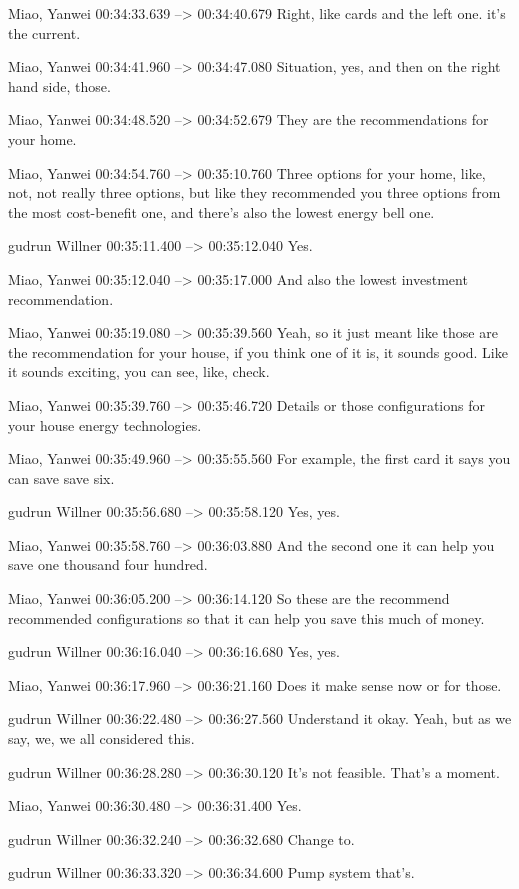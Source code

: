 {Miao, Yanwei 00:34:33.639 --> 00:34:40.679
Right, like cards and the left one. it's the current.

Miao, Yanwei 00:34:41.960 --> 00:34:47.080
Situation, yes, and then on the right hand side, those.

Miao, Yanwei 00:34:48.520 --> 00:34:52.679
They are the recommendations for your home.

Miao, Yanwei 00:34:54.760 --> 00:35:10.760
Three options for your home, like, not, not really three options, but like they recommended you three options from the most cost-benefit one, and there's also the lowest energy bell one.

gudrun Willner 00:35:11.400 --> 00:35:12.040
Yes.

Miao, Yanwei 00:35:12.040 --> 00:35:17.000
And also the lowest investment recommendation.

Miao, Yanwei 00:35:19.080 --> 00:35:39.560
Yeah, so it just meant like those are the recommendation for your house, if you think one of it is, it sounds good. Like it sounds exciting, you can see, like, check.

Miao, Yanwei 00:35:39.760 --> 00:35:46.720
Details or those configurations for your house energy technologies.

Miao, Yanwei 00:35:49.960 --> 00:35:55.560
For example, the first card it says you can save save six.

gudrun Willner 00:35:56.680 --> 00:35:58.120
Yes, yes.

Miao, Yanwei 00:35:58.760 --> 00:36:03.880
And the second one it can help you save one thousand four hundred.

Miao, Yanwei 00:36:05.200 --> 00:36:14.120
So these are the recommend recommended configurations so that it can help you save this much of money.

gudrun Willner 00:36:16.040 --> 00:36:16.680
Yes, yes.

Miao, Yanwei 00:36:17.960 --> 00:36:21.160
Does it make sense now or for those.

gudrun Willner 00:36:22.480 --> 00:36:27.560
Understand it okay. Yeah, but as we say, we, we all considered this.

gudrun Willner 00:36:28.280 --> 00:36:30.120
It's not feasible. That's a moment.

Miao, Yanwei 00:36:30.480 --> 00:36:31.400
Yes.

gudrun Willner 00:36:32.240 --> 00:36:32.680
Change to.

gudrun Willner 00:36:33.320 --> 00:36:34.600
Pump system that's.

}
